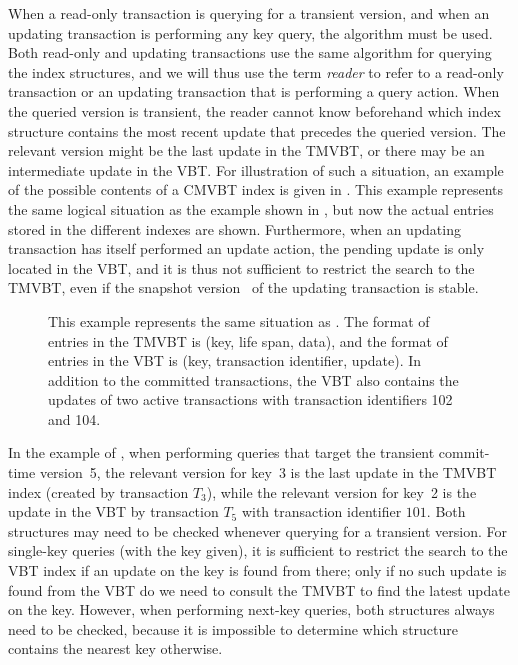 When a read-only transaction is querying for a transient version, and when an
updating transaction is performing any key query, the 
algorithm must be used.
Both read-only and updating transactions use the same
 algorithm for querying the index structures, and we
will thus use the term \emph{reader} to refer to a read-only transaction or
an updating transaction that is performing a query action.
When the queried version is transient, the reader cannot know
beforehand which index structure contains the most recent update that
precedes the queried version.
The relevant version might be the last update in the TMVBT, or
there may be an intermediate update in the VBT\@.
For illustration of such a situation,
an example of the possible contents of a CMVBT index is given in
.
This example represents the same logical situation as the example shown in 
, but now the actual entries stored in the
different indexes are shown.
Furthermore, when an updating transaction has itself performed an update
action, the pending update is only located in the VBT, and it is thus not
sufficient to restrict the search to the TMVBT, even if the snapshot
version~ of the updating transaction is stable.

\begin{figure}[htb]
\begin{center}
  
  {This example represents the same situation as
  .
  The format of entries in the TMVBT is (key, life span, data), and the
  format of entries in the VBT is (key, transaction identifier, update).
  In addition to the committed transactions, the VBT also contains the
  updates of two active transactions with transaction identifiers \num{102}
  and \num{104}.}
  \label{fig:cmvbt-contents}
\end{center}
\end{figure}

In the example of , when performing queries that
target the transient commit-time version~\num{5}, the relevant version for
key~\num{3} is the last update in the TMVBT index (created by transaction
$T_3$), while the relevant version for key~\num{2} is the update in the VBT
by transaction $T_5$ with transaction identifier $101$.
Both structures may need to be checked whenever querying for a transient
version.
For single-key queries (with the key given), it is sufficient to
restrict the search to the VBT index if an update on the key is found from
there; only if no such update is found from the VBT do we need to consult the
TMVBT to find the latest update on the key.
However, when performing next-key queries, both structures always need to be
checked, because it is impossible to determine which structure contains the
nearest key otherwise.

